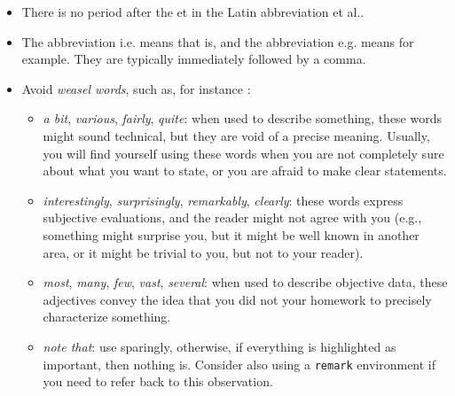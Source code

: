 \documentclass[letterpaper, 10 pt, conference]{ieeeconf}
\begin{document}
\begin{itemize}
\item There is no period after the et in the Latin abbreviation et al..
\item The abbreviation i.e. means that is, and the abbreviation e.g. means for example. They are typically immediately followed by a comma.
\item Avoid \emph{weasel words}, such as, for instance \cite{WeaselWords}:
  \begin{itemize}
  \item \emph{a bit}, \emph{various}, \emph{fairly}, \emph{quite}: when used to describe something, these words might sound technical, but they are void of a precise meaning. Usually, you will find yourself using these words when you are not completely sure about what you want to state, or you are afraid to make clear statements.
  \item \emph{interestingly}, \emph{surprisingly}, \emph{remarkably}, \emph{clearly}: these words express subjective evaluations, and the reader might not agree with you (e.g., something might surprise you, but it might be well known in another area, or it might be trivial to you, but not to your reader).
  \item \emph{most}, \emph{many}, \emph{few}, \emph{vast}, \emph{several}: when used to describe objective data, these adjectives convey the idea that you did not your homework to precisely characterize something.
  \item \emph{note that}: use sparingly, otherwise, if everything is highlighted as important, then nothing is. Consider also using a \texttt{remark} environment if you need to refer back to this observation.
  \end{itemize}
\end{itemize}
\end{document}
